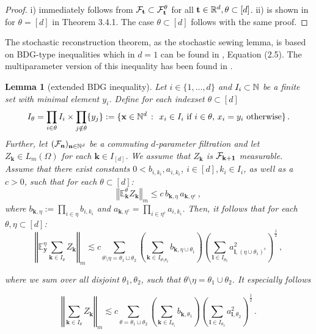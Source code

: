 \documentclass[12pt]{article}
\numberwithin{equation}{section}
\theoremstyle{plain}
\newtheorem{lemma}[theorem]{Lemma}
\theoremstyle{definition}
\newcommand{\norm}[1]{\left\Vert #1\right\Vert}
\def\bR{\mathbb{R}}\def\bS{\mathbb{S}}
\def\bE{\mathbb{E}}\def\bW{\mathbb{W}}
\def\fk{\mathbf k}\def\fl{\mathbf l}
\def\fy{\mathbf y}\def\fz{\mathbf z}
\begin{document}
\begin{proof}
    i) immediately follows from $\mathcal{F}_\mathbf t\subset\mathcal{F}_\mathbf t^\theta$ for all $\ft\in\bR^d, \theta\subset[d]$.
    ii) is shown in \cite{Khoshnevisan02} for $\theta =[d]$ in Theorem 3.4.1. The case $\theta\subset[d]$ follows with the same proof.
\end{proof}
    
 The stochastic reconstruction theorem, as the stochastic sewing lemma, is based on BDG-type inequalities which in $d=1$ can be found in \cite{le2020}, Equation (2.5). The multiparameter version of this inequality has been found in \cite[Lemma 25]{multiparameterStochSewing}.

\begin{lemma}[extended BDG inequality]\label{lem:multiparameterBDG}
    Let  $i\in\{1,\dots,d\}$ and $I_i\subset\mathbb{N}$ be a finite set with minimal element $y_i$. Define  for each indexset $\theta\subset [d]$ 
    \[
    I_\theta = \prod_{i\in\theta} I_i\times\prod_{j\notin\theta}\{y_j\} := \{\mathbf x\in\mathbb{N}^d~\colon~ x_i\in I_i \text{ if $i\in\theta$, } x_i = y_i\text{ otherwise}\}\,.
    \]
    Further, let $(\mathcal F_\mathbf n)_{\mathbf n\in\mathbb{N}^d}$ be a commuting $d$-parameter filtration and let $Z_\fk\in L_m(\Omega)$ for each $\fk\in I_{[d]}$. We assume that $Z_\fk$ is $\cF_{\fk+ \boldsymbol 1}$ measurable. Assume that there exist constants $0<b_{i,k_i}, a_{i,k_i}$, $i\in[d], k_i\in I_i$, as well as a $c>0$, such that for each $\theta \subset[d]$:
%
\begin{equation}\label{ineq:lem3Condtition}
    \norm{\bE^\theta_\fk Z_{\fk}}_m\le c \,b_{\fk,\eta} \,a_{\fk,\eta^c}\,,
\end{equation}
%
where $b_{\fk,\eta} := \prod_{i\in\eta} b_{i,k_i}$ and $a_{\fk,\eta^c} = \prod_{i\in\eta^c}a_{i,k_i}$. Then, it follows that for each $\theta,\eta\subset[d]$:
%
\begin{equation}\label{ineq:lem3Result}
    \norm{\bE^\eta_{\fy}\sum_{\fk\in I_{\theta}} Z_{\fk}}_m\lesssim c\sum_{\theta\setminus\eta = \theta_1\sqcup \theta_2} \left(\sum_{\fk\in I_{\theta\setminus\theta_2}} b_{\fk,\eta\cup\theta_1}\right) \left(\sum_{\fl\in I_{\theta_2}} a_{\fl,(\eta\cup\theta_1)^c}^2\right)^{\frac 12}\,,
\end{equation}

where we sum over all disjoint $\theta_1,\theta_2$, such that $\theta\setminus\eta=\theta_1\cup\theta_2$. It especially follows

\begin{equation*}
    \norm   {\sum_{\fk\in I_{\theta}} Z_{\fk}}_m\lesssim c\sum_{\theta = \theta_1\sqcup\theta_2} \left(\sum_{\fk\in I_{\theta_1}} b_{\fk,\theta_1}\right) \left(\sum_{\fl\in I_{\theta_2}} a_{\fl,\theta_2}^2\right)^{\frac 12}\,.
\end{equation*}
\end{lemma}
\end{document}
